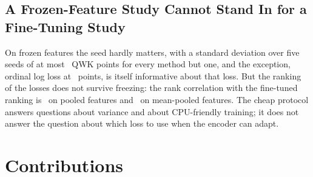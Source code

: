 \subsection{A Frozen-Feature Study Cannot Stand In for a Fine-Tuning Study}

On frozen features the seed hardly matters, with a standard deviation over five seeds of at most
\cpuStdMaxQwk\ QWK points for every method but one, and the exception, ordinal log loss at
\cpuStdOll\ points, is itself informative about that loss. But the ranking of the losses does
not survive freezing: the rank correlation with the fine-tuned ranking is
\cpuSpearmanPooler\ on pooled features and \cpuSpearmanMean\ on mean-pooled features. The cheap
protocol answers questions about variance and about CPU-friendly training; it does not answer
the question about which loss to use when the encoder can adapt.

\section{Contributions}

